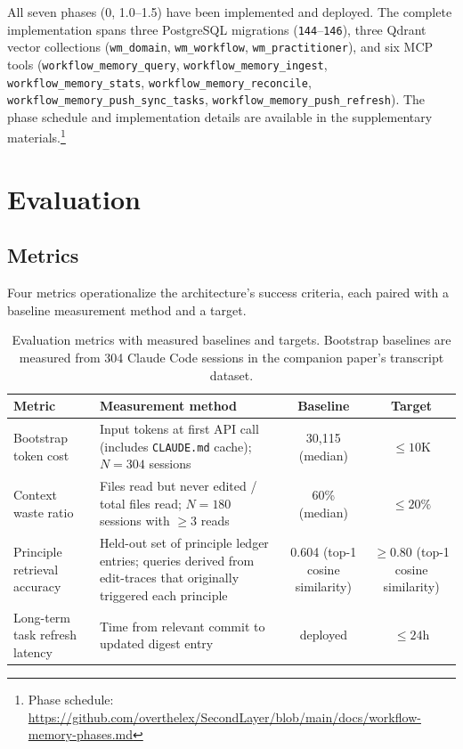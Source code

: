 \documentclass[11pt]{article}
\begin{document}
All seven phases (0, 1.0--1.5) have been implemented and deployed.
The complete implementation spans three PostgreSQL migrations (\texttt{144}--\texttt{146}), three Qdrant vector collections (\texttt{wm\_domain}, \texttt{wm\_workflow}, \texttt{wm\_practitioner}), and six MCP tools (\texttt{workflow\_memory\_query}, \texttt{workflow\_memory\_ingest}, \texttt{workflow\_memory\_stats}, \texttt{workflow\_memory\_reconcile}, \texttt{workflow\_memory\_push\_sync\_tasks}, \texttt{workflow\_memory\_push\_refresh}).
The phase schedule and implementation details are available in the supplementary materials.\footnote{Phase schedule: \url{https://github.com/overthelex/SecondLayer/blob/main/docs/workflow-memory-phases.md}}


\section{Evaluation}
\label{sec:evaluation}

\subsection{Metrics}
\label{sec:metrics}

Four metrics operationalize the architecture's success criteria, each paired with a baseline measurement method and a target.

\begin{table}[h]
\centering
\small
\begin{tabularx}{\textwidth}{@{}l X c c@{}}
\toprule
\textbf{Metric} & \textbf{Measurement method} & \textbf{Baseline} & \textbf{Target} \\
\midrule
Bootstrap token cost &
  Input tokens at first API call (includes \texttt{CLAUDE.md} cache); $N{=}304$ sessions &
  30{,}115 (median) & ${\leq}10$K \\
\addlinespace
Context waste ratio &
  Files read but never edited / total files read; $N{=}180$ sessions with ${\geq}3$ reads &
  60\% (median) & ${\leq}20\%$ \\
\addlinespace
Principle retrieval accuracy &
  Held-out set of principle ledger entries; queries derived from edit-traces that originally triggered each principle &
  0.604 (top-1 cosine similarity) & ${\geq}0.80$ (top-1 cosine similarity) \\
\addlinespace
Long-term task refresh latency &
  Time from relevant commit to updated digest entry &
  deployed & ${\leq}24$h \\
\bottomrule
\end{tabularx}
\caption{Evaluation metrics with measured baselines and targets.
  Bootstrap baselines are measured from 304 Claude Code sessions in the companion paper's transcript dataset.}
\label{tab:metrics}
\end{table}
\end{document}
